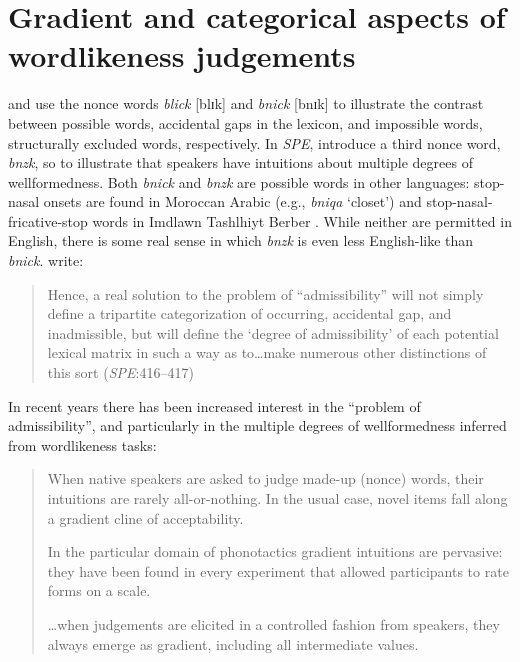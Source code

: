 \chapter{Gradient and categorical aspects of wordlikeness judgements} 
\label{gradience}

\citet{Halle1962} and \citet{Chomsky1965} use the nonce words \emph{blick} [blɪk] and \emph{bnick} [bnɪk] to illustrate the contrast between possible words, accidental gaps in the lexicon, and impossible words, structurally excluded words, respectively. In \emph{SPE}, \citealt{SPE} introduce a third nonce word, \emph{bnzk}, so to illustrate that speakers have intuitions about multiple degrees of wellformedness. Both \emph{bnick} and \emph{bnzk} are possible words in other languages: stop-nasal onsets are found in Moroccan Arabic (e.g., \emph{bniqa} `closet') and stop-nasal-fricative-stop words in Imdlawn Tashlhiyt Berber \citep{Dell1984}. While neither are permitted in English, there is some real sense in which \emph{bnzk} is even less English-like than \emph{bnick}. \citeauthor{SPE} write:

\begin{quote}
Hence, a real solution to the problem of ``admissibility'' will not simply define a tripartite categorization of occurring, accidental gap, and inadmissible, but will define the `degree of admissibility' of each potential lexical matrix in such a way as to\ldots{}make numerous other distinctions of this sort (\emph{SPE}:416--417)
\end{quote}

In recent years there has been increased interest in the ``problem of admissibility'', and particularly in the multiple degrees of wellformedness inferred from wordlikeness tasks:

\begin{quote}
When native speakers are asked to judge made-up (nonce) words, their intuitions are rarely all-or-nothing. In the usual case, novel items fall along a gradient cline of acceptability. \citep[][9]{Albright2009a}

In the particular domain of phonotactics gradient intuitions are pervasive: they have been found in every experiment that allowed participants to rate forms on a scale.
\citep[][382]{Hayes2008a}

\ldots{}when judgements are elicited in a controlled fashion from speakers, they always emerge as gradient, including all intermediate values. \citep[371]{Shademan2006} 
\end{quote}



